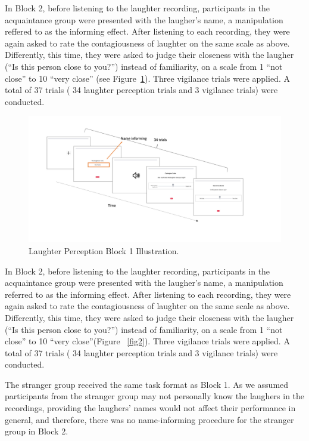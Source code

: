 In Block 2, before listening to the laughter recording, participants in the acquaintance group were presented with the laugher’s name, a manipulation reffered to as the informing effect. After listening to each recording, they were again asked to rate the contagiousness of laughter on the same scale as above. Differently, this time, they were asked to judge their closeness with the laugher (“Is this person close to you?”) instead of familiarity, on a scale from 1 “not close” to 10 “very close” (see Figure~\ref{fig1}). Three vigilance trials were applied. A total of 37 trials ( 34 laughter perception trials and 3 vigilance trials) were conducted.

\begin{figure}[h!] 
\centering
\includegraphics[width=1\textwidth]{Slide2.jpeg}
\caption{\label{fig1}Laughter Perception Block 1 Illustration.}
\end{figure}

In Block 2, before listening to the laughter recording, participants in the acquaintance group were presented with the laugher’s name, a manipulation referred to as the informing effect. After listening to each recording, they were again asked to rate the contagiousness of laughter on the same scale as above. Differently, this time, they were asked to judge their closeness with the laugher (“Is this person close to you?”) instead of familiarity, on a scale from 1 “not close” to 10 “very close”(Figure ~\ref{fig2}). Three vigilance trials were applied. A total of 37 trials ( 34 laughter perception trials and 3 vigilance trials) were conducted.

The stranger group received the same task format as Block 1. As we assumed participants from the stranger group may not personally know the laughers in the recordings, providing the laughers’ names would not affect their performance in general, and therefore, there was no name-informing procedure for the stranger group in Block 2.

